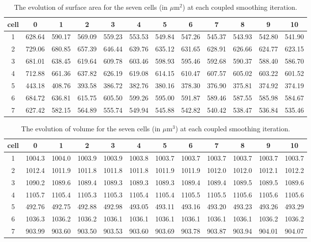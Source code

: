 \documentclass[a4paper,10pt]{article}
\begin{document}
\begin{table}[H]
\begin{center}
\footnotesize
\begin{tabular}{|c|ccccccccccc|}
\hline
cell & 0 &1 &2 &3 &4 &5 &6 &7 &8 &9 &10\\
\hline
1 &628.64 &590.17 &569.09 &559.23 &553.53 &549.84 &547.26 &545.37 &543.93 &542.80 &541.90\\
2 &729.06 &680.85 &657.39 &646.44 &639.76 &635.12 &631.65 &628.91 &626.66 &624.77 &623.15\\
3 &681.01 &638.45 &619.64 &609.78 &603.46 &598.93 &595.46 &592.68 &590.37 &588.40 &586.70\\
4 &712.88 &661.36 &637.82 &626.19 &619.08 &614.15 &610.47 &607.57 &605.02 &603.22 &601.52\\
5 &443.18 &408.76 &393.58 &386.72 &382.76 &380.16 &378.30 &376.90 &375.81 &374.92 &374.19\\
6 &684.72 &636.81 &615.75 &605.50 &599.26 &595.00 &591.87 &589.46 &587.55 &585.98 &584.67\\
7 &627.42 &582.15 &564.89 &555.74 &549.94 &545.88 &542.82 &540.42 &538.47 &536.84 &535.46\\
\hline
\end{tabular}
\end{center}
\caption{The evolution of surface area for the seven cells (in $\mu \text{m}^2$)  at each coupled smoothing iteration.}
\label{tab:surf}
\end{table}

\begin{table}[H]
\begin{center}
\footnotesize
\begin{tabular}{|c|ccccccccccc|}
\hline
cell & 0 &1 &2 &3 &4 &5 &6 &7 &8 &9 &10\\
\hline
1 &1004.3 &1004.0 &1003.9 &1003.9 &1003.8 &1003.7 &1003.7 &1003.7 &1003.7 &1003.7 &1003.7\\
2 &1012.4 &1011.9 &1011.8 &1011.8 &1011.8 &1011.9 &1011.9 &1012.0 &1012.0 &1012.1 &1012.2\\
3 &1090.2 &1089.6 &1089.4 &1089.3 &1089.3 &1089.3 &1089.4 &1089.4 &1089.5 &1089.5 &1089.6\\
4 &1105.7 &1105.4 &1105.3 &1105.3 &1105.4 &1105.4 &1105.5 &1105.5 &1105.6 &1105.6 &1105.6\\
5 &492.76 &492.75 &492.88 &492.98 &493.05 &493.11 &493.16 &493.20 &493.23 &493.26 &493.29\\
6 &1036.3 &1036.2 &1036.2 &1036.1 &1036.1 &1036.1 &1036.1 &1036.1 &1036.1 &1036.2 &1036.2\\
7 &903.99 &903.60 &903.50 &903.53 &903.60 &903.69 &903.78 &903.87 &903.94 &904.01 &904.07\\
\hline
\end{tabular}
\end{center}
\caption{The evolution of volume for the seven cells (in $\mu \text{m}^3$)  at each coupled smoothing iteration.}
\label{tab:vol}
\end{table}
\end{document}
